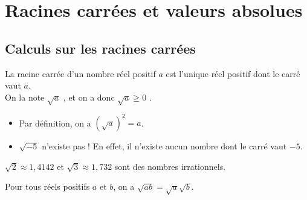 


\chapter{Racines carrées et valeurs absolues}




\section{Calculs sur les racines carrées}

\begin{Définition}
La racine carrée d'un nombre réel positif $a$ est l'unique réel positif dont le carré vaut $a$. \\ On la note $\sqrt{a}$ , et on a donc $\sqrt{a}\geq 0$ .
\end{Définition}

\begin{Remarque}
\leavevmode\vspace{-\baselineskip}
\begin{itemize}[label=\textcolor{Couleur7}{$\bullet$}]
\item Par définition, on a $\left(\sqrt{a}\right)^2=a$.
\item $\sqrt{-5}$ n'existe pas ! En effet, il n'existe aucun nombre dont le carré vaut $-5$.
\end{itemize}

\end{Remarque}


\begin{Exemple}

\ligne

\ligne



\end{Exemple}

\begin{Remarque}
$\sqrt{2}\approx 1,4142$ et $\sqrt{3}\approx 1,732$ sont des nombres irrationnels.

\end{Remarque}

\vspace{0.4cm}

\begin{Propriété}
Pour tous réels positifs $a$ et $b$, on a $\sqrt{ab}=\sqrt{a}\sqrt{b}$.
\end{Propriété}

